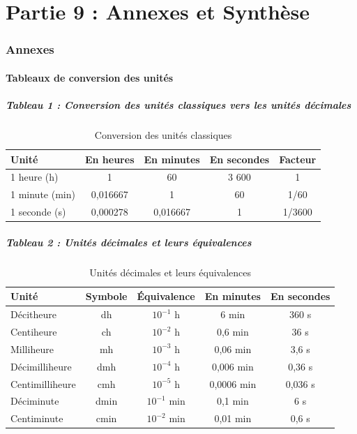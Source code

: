 \documentclass[a4paper,12pt]{article}
\begin{document}
\part*{Partie 9 : Annexes et Synthèse}

\section{Annexes}

\subsection{Tableaux de conversion des unités}

\subsubsection{Tableau 1 : Conversion des unités classiques vers les unités décimales}

\begin{table}[ht]
\centering
\begin{tabular}{|l|c|c|c|c|}
\hline
\textbf{Unité} & \textbf{En heures} & \textbf{En minutes} & \textbf{En secondes} & \textbf{Facteur} \\
\hline
1 heure (h) & 1 & 60 & 3 600 & 1 \\
1 minute (min) & 0,016667 & 1 & 60 & 1/60 \\
1 seconde (s) & 0,000278 & 0,016667 & 1 & 1/3600 \\
\hline
\end{tabular}
\caption{Conversion des unités classiques}
\end{table}

\subsubsection{Tableau 2 : Unités décimales et leurs équivalences}

\begin{table}[ht]
\centering
\begin{tabular}{|l|c|c|c|c|}
\hline
\textbf{Unité} & \textbf{Symbole} & \textbf{Équivalence} & \textbf{En minutes} & \textbf{En secondes} \\
\hline
Décitheure & dh & $10^{-1}$ h & 6 min & 360 s \\
Centiheure & ch & $10^{-2}$ h & 0,6 min & 36 s \\
Milliheure & mh & $10^{-3}$ h & 0,06 min & 3,6 s \\
Décimilliheure & dmh & $10^{-4}$ h & 0,006 min & 0,36 s \\
Centimilliheure & cmh & $10^{-5}$ h & 0,0006 min & 0,036 s \\
\hline
Déciminute & dmin & $10^{-1}$ min & 0,1 min & 6 s \\
Centiminute & cmin & $10^{-2}$ min & 0,01 min & 0,6 s \\
\hline
\end{tabular}
\caption{Unités décimales et leurs équivalences}
\end{table}
\end{document}
